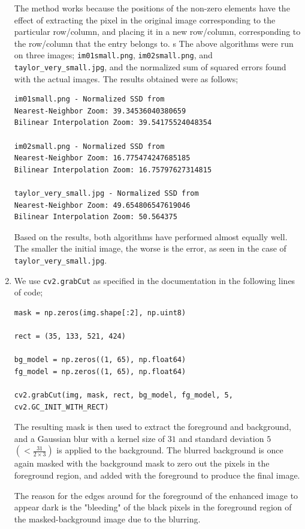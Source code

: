 \documentclass{article}[a4paper]
\begin{document}
\begin{enumerate}
	The method works because the positions of the non-zero elements have the effect of extracting the pixel in the original image corresponding to the particular
	row/column, and placing it in a new row/column, corresponding to the row/column that the entry belongs to.
s
	The above algorithms were run on three images; \texttt{im01small.png}, \texttt{im02small.png}, and \texttt{taylor\_very\_small.jpg}, and the
	normalized sum of squared errors found with the actual images. The results obtained were as follows;
	\begin{verbatim}im01small.png - Normalized SSD from
Nearest-Neighbor Zoom: 39.34536040380659
Bilinear Interpolation Zoom: 39.54175524048354

im02small.png - Normalized SSD from
Nearest-Neighbor Zoom: 16.775474247685185
Bilinear Interpolation Zoom: 16.75797627314815

taylor_very_small.jpg - Normalized SSD from
Nearest-Neighbor Zoom: 49.654806547619046
Bilinear Interpolation Zoom: 50.564375\end{verbatim}Based on the results, both algorithms have performed almost equally well. The smaller the initial image, the worse is the error, as seen in the case 
	of \texttt{taylor\_very\_small.jpg}.

	\item We use \lstinline|cv2.grabCut| as specified in the documentation in the following lines of code;
	\begin{lstlisting}
mask = np.zeros(img.shape[:2], np.uint8)

rect = (35, 133, 521, 424)

bg_model = np.zeros((1, 65), np.float64)
fg_model = np.zeros((1, 65), np.float64)

cv2.grabCut(img, mask, rect, bg_model, fg_model, 5, cv2.GC_INIT_WITH_RECT)
	\end{lstlisting}
The resulting mask is then used to extract the foreground and background, and a Gaussian blur with a kernel size of $31$ and
standard deviation $5$ $\left(<\frac{31}{2 \times 3}\right)$ is applied to the background. The blurred background is once again masked
with the background mask to zero out the pixels in the foreground region, and added with the foreground to produce the final image.

The reason for the edges around for the foreground of the enhanced image to appear dark is the "bleeding" of the black pixels in the
foreground region of the masked-background image due to the blurring.


\end{enumerate}
\end{document}
